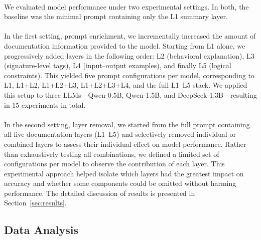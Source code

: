 \documentclass[a4paper]{usiinfbachelorproject}
\begin{document}
\\[2pt]
We evaluated model performance under two experimental settings. In both, the baseline was the minimal prompt containing only the L1 summary layer.\\
\\[2pt]
In the first setting, prompt enrichment, we incrementally increased the amount of documentation information provided to the model. Starting from L1 alone, we progressively added layers in the following order: L2 (behavioral explanation), L3 (signature-level tags), L4 (input–output examples), and finally L5 (logical constraints). This yielded five prompt configurations per model, corresponding to L1, L1+L2, L1+L2+L3, L1+L2+L3+L4, and the full L1–L5 stack. We applied this setup to three LLMs—Qwen-0.5B, Qwen-1.5B, and DeepSeek-1.3B—resulting in 15 experiments in total.\\
\\[2pt]
In the second setting, layer removal, we started from the full prompt containing all five documentation layers (L1–L5) and selectively removed individual or combined layers to assess their individual effect on model performance. Rather than exhaustively testing all combinations, we defined a limited set of configurations per model to observe the contribution of each layer. This experimental approach helped isolate which layers had the greatest impact on accuracy and whether some components could be omitted without harming performance. The detailed discussion of results is presented in Section~\ref{sec:results}.

\subsection{Data Analysis}\label{sec:analysis}
\end{document}
